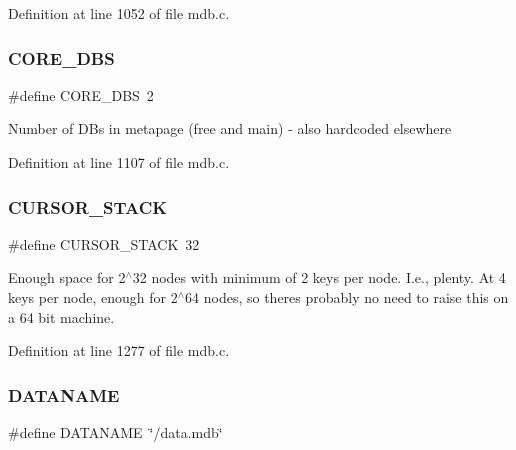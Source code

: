 Definition at line 1052 of file mdb.\+c.

\mbox{\label{group__internal_ga9c5573d169b885743bc9208c23c7e82b}} 
\subsubsection{\texorpdfstring{C\+O\+R\+E\+\_\+\+D\+BS}{CORE\_DBS}}
{\footnotesize\ttfamily \#define C\+O\+R\+E\+\_\+\+D\+BS~2}

Number of D\+Bs in metapage (free and main) -\/ also hardcoded elsewhere 

Definition at line 1107 of file mdb.\+c.

\mbox{\label{group__internal_gaef453f149efb721c2eb311a6ede48dc8}} 
\subsubsection{\texorpdfstring{C\+U\+R\+S\+O\+R\+\_\+\+S\+T\+A\+CK}{CURSOR\_STACK}}
{\footnotesize\ttfamily \#define C\+U\+R\+S\+O\+R\+\_\+\+S\+T\+A\+CK~32}

Enough space for 2$^\wedge$32 nodes with minimum of 2 keys per node. I.\+e., plenty. At 4 keys per node, enough for 2$^\wedge$64 nodes, so there\textquotesingle{}s probably no need to raise this on a 64 bit machine. 

Definition at line 1277 of file mdb.\+c.

\mbox{\label{group__internal_gad5a54432b85530e3f2cf9b88488e0eee}} 
\subsubsection{\texorpdfstring{D\+A\+T\+A\+N\+A\+ME}{DATANAME}}
{\footnotesize\ttfamily \#define D\+A\+T\+A\+N\+A\+ME~\char`\"{}/data.\+mdb\char`\"{}}


